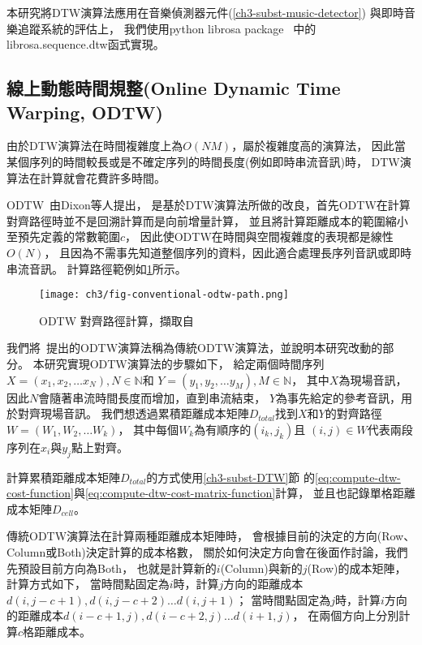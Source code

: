 \documentclass[class=NCU_thesis, crop=false]{standalone}
\begin{document}
本研究將DTW演算法應用在音樂偵測器元件(\cref{ch3-subst-music-detector})
與即時音樂追蹤系統的評估上，
我們使用python librosa package~\cite{McFee2024librosa}
中的librosa.sequence.dtw函式實現。

\subsection{線上動態時間規整(Online Dynamic Time Warping, ODTW)} \label{ch3-subst-ODTW}
由於DTW演算法在時間複雜度上為$O(NM)$，屬於複雜度高的演算法，
因此當某個序列的時間較長或是不確定序列的時間長度(例如即時串流音訊)時，
DTW演算法在計算就會花費許多時間。

ODTW~\cite{dixon2005ODTW}由Dixon等人提出，
是基於DTW演算法所做的改良，首先ODTW在計算對齊路徑時並不是回溯計算而是向前增量計算，
並且將計算距離成本的範圍縮小至預先定義的常數範圍$c$，
因此使ODTW在時間與空間複雜度的表現都是線性$O(N)$，
且因為不需事先知道整個序列的資料，因此適合處理長序列音訊或即時串流音訊。
計算路徑範例如\cref{fig:fig-ch3-conventional-odtw-path}所示。

\begin{figure}[H]
    \centering
    \texttt{[image: ch3/fig-conventional-odtw-path.png]}
    \caption{ODTW 對齊路徑計算，擷取自~\cite{dixon2005ODTW}}
    \label{fig:fig-ch3-conventional-odtw-path}
\end{figure}

我們將~\cite{dixon2005ODTW}提出的ODTW演算法稱為傳統ODTW演算法，並說明本研究改動的部分。
本研究實現ODTW演算法的步驟如下，
給定兩個時間序列
$X = (x_1, x_2, \dots x_N), N \in \mathbb{N}$和
$Y = (y_1, y_2, \dots y_M), M \in \mathbb{N}$，
其中$X$為現場音訊，因此$N$會隨著串流時間長度而增加，直到串流結束，
$Y$為事先給定的參考音訊，用於對齊現場音訊。
我們想透過累積距離成本矩陣$D_{total}$找到$X$和$Y$的對齊路徑$W = (W_1, W_2, \dots W_k)$，
其中每個$W_k$為有順序的$(i_k,j_k)$且
$(i,j) \in W$代表兩段序列在$x_i$與$y_j$點上對齊。

計算累積距離成本矩陣$D_{total}$的方式使用\ref{ch3-subst-DTW}節
的\cref{eq:compute-dtw-cost-function}與\cref{eq:compute-dtw-cost-matrix-function}計算，
並且也記錄單格距離成本矩陣$D_{cell}$。

傳統ODTW演算法在計算兩種距離成本矩陣時，
會根據目前的決定的方向(Row、Column或Both)決定計算的成本格數，
關於如何決定方向會在後面作討論，我們先預設目前方向為Both，
也就是計算新的$i$(Column)與新的$j$(Row)的成本矩陣，
計算方式如下，
當時間點固定為$i$時，計算$j$方向的距離成本$d(i, j-c+1), d(i, j-c+2) \dots d(i, j+1)$；
當時間點固定為$j$時，計算$i$方向的距離成本$d(i-c+1, j), d(i-c+2, j) \dots d(i+1, j)$，
在兩個方向上分別計算$c$格距離成本。
\end{document}
